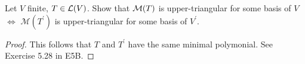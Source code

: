 \documentclass[../main.tex]{subfiles}
\begin{document}
\begin{exercise}
  Let $V$ finite, $T \in \mathcal{L}(V)$. Show that $\mathcal{M}(T)$ is upper-triangular for some basis of $V$
  $\iff$ $\mathcal{M}(T^\prime)$ is upper-triangular for some basis of $V^\prime$.
\end{exercise}
\begin{proof}
  This follows that $T$ and $T^\prime$ have the same minimal polymonial.
  See Exercise 5.28 in E5B.
\end{proof}
\end{document}

